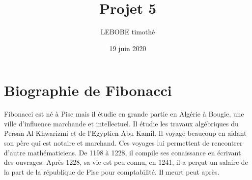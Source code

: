 \documentclass{article}
\title{Projet 5}
\author{LEBOBE timothé}
\date{19 juin 2020}
\begin{document}
    \maketitle
    \tableofcontents

    \section{Biographie de Fibonacci}
        Fibonacci est né à Pise mais il étudie en grande partie en Algérie à Bougie, une ville d'influence marchande et intellectuel.
        Il étudie les travaux algébriques du Persan Al-Khwarizmi et de l'Egyptien Abu Kamil. Il voyage beaucoup en aidant son père qui est
        notaire et marchand. Ces voyages lui permettent de rencontrer d'autre mathématiciens. De 1198 à 1228, il compile ses conaissance 
        en écrivant des ouvrages. Après 1228, sa vie est peu connu, en 1241, il a perçut un salaire de la part de la république de Pise
        pour comptabilité. Il meurt peut après.
\end{document}
